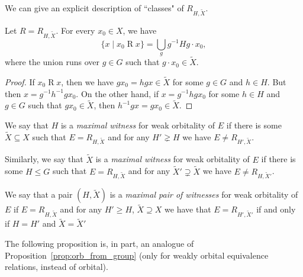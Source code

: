 	We can give an explicit description of ``classes" of $R_{H,\tilde X}$.
	
	\begin{lem}
		\label{lem:worb_class_description}
		Let $R=R_{H,\tilde X}$. For every $x_0\in X$, we have
		\[
		\{x\mid x_0\mathrel R x \}=\bigcup_{g} g^{-1} H g\cdot x_0,
		\]
		where the union runs over $g\in G$ such that $g\cdot x_0\in \tilde X$.
	\end{lem}
	\begin{proof}
		If $x_0\mathrel R x $, then we have $gx_0=hgx\in \tilde X$ for some $g\in G$ and $h\in H$. But then $x= g^{-1}h^{-1}gx_0$. On the other hand, if $x=g^{-1}hgx_0$ for some $h\in H$ and $g\in G$ such that $g x_0\in \tilde X$, then $h^{-1}g x=g x_0\in \tilde X$.
	\end{proof}
	
	
	
	\begin{dfn}
		\label{dfn:max_witness}
		We say that $H$ is a \emph{maximal witness} for weak orbitality of $E$ if there is some $\tilde X\subseteq X$ such that $E=R_{H,\tilde X}$ and for any $H'\gneq H$ we have $E\neq R_{H',\tilde X}$.
		
		Similarly, we say that $\tilde X$ is a \emph{maximal witness} for weak orbitality of $E$ if there is some $H\leq G$ such that $E=R_{H,\tilde X}$ and for any $\tilde X'\supsetneq \tilde X$ we have $E\neq R_{H,\tilde X'}$.
		
		We say that a pair $(H,\tilde X)$ is a \emph{maximal pair of witnesses} for weak orbitality of $E$ if $E=R_{H,\tilde X}$ and for any $H'\geq H$, $\tilde X\supseteq X$ we have that $E=R_{H',\tilde X'}$ if and only if $H=H'$ and $\tilde X=\tilde X'$\xqed{\lozenge}
	\end{dfn}
	
	The following proposition is, in part, an analogue of Proposition~\ref{prop:orb_from_group} (only for weakly orbital equivalence relations, instead of orbital).
	
